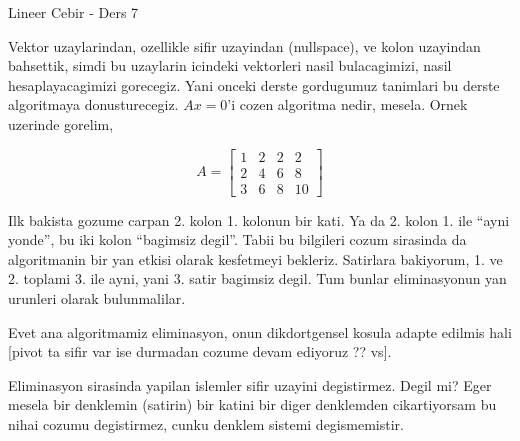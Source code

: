 \documentclass[12pt,fleqn]{article}\usepackage{../common}
\begin{document}
Lineer Cebir - Ders 7

Vektor uzaylarindan, ozellikle sifir uzayindan (nullspace), ve kolon
uzayindan bahsettik, simdi bu uzaylarin icindeki vektorleri nasil
bulacagimizi, nasil hesaplayacagimizi gorecegiz. Yani onceki derste
gordugumuz tanimlari bu derste algoritmaya donusturecegiz. $Ax=0$'i cozen
algoritma nedir, mesela. Ornek uzerinde gorelim,

$$ 
A = 
\left[\begin{array}{rrrr}
1 & 2 & 2 & 2  \\
2 & 4 & 6 & 8 \\
3 & 6 & 8 & 10
\end{array}\right]
 $$

Ilk bakista gozume carpan 2. kolon 1. kolonun bir kati. Ya da 2. kolon
1. ile ``ayni yonde'', bu iki kolon ``bagimsiz degil''. Tabii bu bilgileri 
cozum sirasinda da algoritmanin bir yan etkisi olarak kesfetmeyi
bekleriz. Satirlara bakiyorum, 1. ve 2. toplami 3. ile ayni, yani 3. satir
bagimsiz degil. Tum bunlar eliminasyonun yan urunleri olarak bulunmalilar. 

Evet ana algoritmamiz eliminasyon, onun dikdortgensel kosula adapte edilmis
hali [pivot ta sifir var ise durmadan cozume devam ediyoruz ?? vs].

Eliminasyon sirasinda yapilan islemler sifir uzayini degistirmez. Degil mi?
Eger mesela bir denklemin (satirin) bir katini bir diger denklemden
cikartiyorsam bu nihai cozumu degistirmez, cunku denklem sistemi
degismemistir. 
\end{document}
